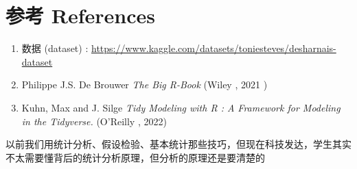 \hypertarget{ux53c2ux8003-references}{%
\section{参考 References}\label{ux53c2ux8003-references}}

\begin{enumerate}
\tightlist
\item
  数据 (dataset) :
  \url{https://www.kaggle.com/datasets/toniesteves/desharnais-dataset}
\item
  Philippe J.S. De Brouwer \emph{The Big R-Book} (Wiley , 2021 )
\item
  Kuhn, Max and J. Silge \emph{Tidy Modeling with R : A Framework for
  Modeling in the Tidyverse.} (O'Reilly , 2022)
\end{enumerate}

以前我们用统计分析、假设检验、基本统计那些技巧，但现在科技发达，学生其实不太需要懂背后的统计分析原理，但分析的原理还是要清楚的\\


